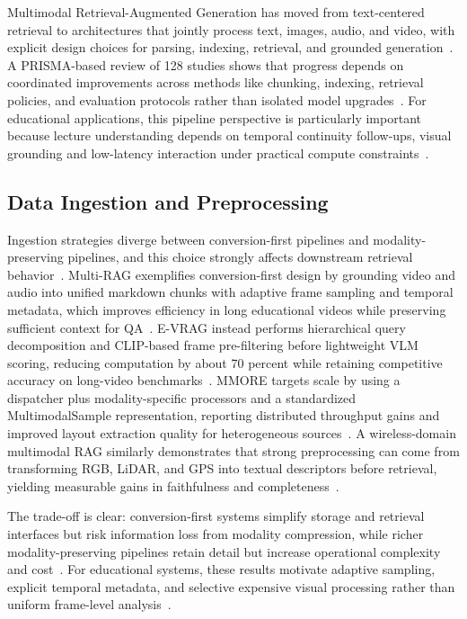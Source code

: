 \documentclass[conference]{IEEEtran}
\begin{document}
    Multimodal Retrieval-Augmented Generation has moved from text-centered retrieval to architectures that jointly process text, images, audio, and video, with explicit design choices for parsing, indexing, retrieval, and grounded generation~\cite{mei2024survey}. A PRISMA-based review of 128 studies shows that progress depends on coordinated improvements across methods like chunking, indexing, retrieval policies, and evaluation protocols rather than isolated model upgrades~\cite{brown2024systematic}. For educational applications, this pipeline perspective is particularly important because lecture understanding depends on temporal continuity follow-ups, visual grounding and low-latency interaction under practical compute constraints~\cite{zheng2024retrieval,mao2024multi,xu2024evrag}.

    \subsection{Data Ingestion and Preprocessing}

    Ingestion strategies diverge between conversion-first pipelines and modality-preserving pipelines, and this choice strongly affects downstream retrieval behavior~\cite{mei2024survey}. Multi-RAG exemplifies conversion-first design by grounding video and audio into unified markdown chunks with adaptive frame sampling and temporal metadata, which improves efficiency in long educational videos while preserving sufficient context for QA~\cite{mao2024multi}. E-VRAG instead performs hierarchical query decomposition and CLIP-based frame pre-filtering before lightweight VLM scoring, reducing computation by about 70 percent while retaining competitive accuracy on long-video benchmarks~\cite{xu2024evrag}. MMORE targets scale by using a dispatcher plus modality-specific processors and a standardized MultimodalSample representation, reporting distributed throughput gains and improved layout extraction quality for heterogeneous sources~\cite{sallinen2024mmore}. A wireless-domain multimodal RAG similarly demonstrates that strong preprocessing can come from transforming RGB, LiDAR, and GPS into textual descriptors before retrieval, yielding measurable gains in faithfulness and completeness~\cite{mohsin2024retrieval}.

    The trade-off is clear: conversion-first systems simplify storage and retrieval interfaces but risk information loss from modality compression, while richer modality-preserving pipelines retain detail but increase operational complexity and cost~\cite{mei2024survey,zheng2024retrieval}. For educational systems, these results motivate adaptive sampling, explicit temporal metadata, and selective expensive visual processing rather than uniform frame-level analysis~\cite{mao2024multi,xu2024evrag,sallinen2024mmore}.
\end{document}
